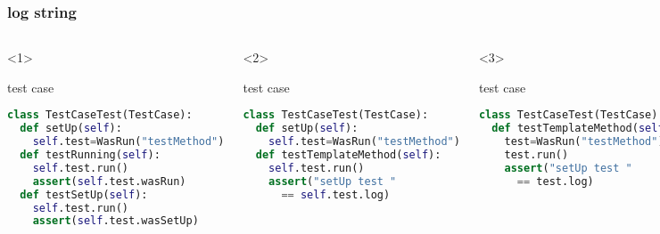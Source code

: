 \documentclass[lualatex]{beamer}
\begin{document}
\begin{frame}[fragile,t]
    \frametitle{log string}

    \begin{columns}[t]
        \small
        \begin{onlyenv}<1>
            \begin{block}{test case}
                \begin{lstlisting}[language=Python,columns=fullflexible]
class TestCaseTest(TestCase):
  def setUp(self):
    self.test=WasRun("testMethod")
  def testRunning(self):
    self.test.run()
    assert(self.test.wasRun)
  def testSetUp(self):
    self.test.run()
    assert(self.test.wasSetUp)
                \end{lstlisting}
            \end{block}
        \end{onlyenv}

        \begin{onlyenv}<2>
            \begin{block}{test case}
                \begin{lstlisting}[language=Python,columns=fullflexible]
class TestCaseTest(TestCase):
  def setUp(self):
    self.test=WasRun("testMethod")
  def testTemplateMethod(self):
    self.test.run()
    assert("setUp test "
      == self.test.log)
                \end{lstlisting}
            \end{block}
        \end{onlyenv}

        \begin{onlyenv}<3>
            \begin{block}{test case}
                \begin{lstlisting}[language=Python,columns=fullflexible]
class TestCaseTest(TestCase):
  def testTemplateMethod(self):
    test=WasRun("testMethod")
    test.run()
    assert("setUp test "
      == test.log)
                \end{lstlisting}
            \end{block}
        \end{onlyenv}

        \begin{onlyenv}<1>
            \begin{block}{functional codes}
                \begin{lstlisting}[language=Python,columns=fullflexible]
class WasRun(TestCase):
  def __init__(self,name):
    TestCase.__init__(self, name)
  def testMethod(self):
    self.wasRun = 1
  def setUp(self):
    self.wasRun = 0
    self.wasSetUp = 1
                \end{lstlisting}
            \end{block}
        \end{onlyenv}


\end{columns}
\end{frame}
\end{document}
